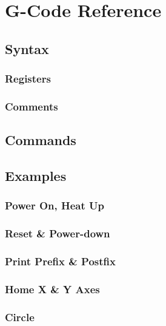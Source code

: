 \chapter{G-Code Reference}
	
	\section{Syntax}
		
		\subsection{Registers}
		
		\subsection{Comments}
	
	\section{Commands}
	
	\section{Examples}
	
		\subsection{Power On, Heat Up}
		
		\subsection{Reset \& Power-down}
		
		\subsection{Print Prefix \& Postfix}
		
		\subsection{Home X \& Y Axes}
		
		\subsection{Circle}
